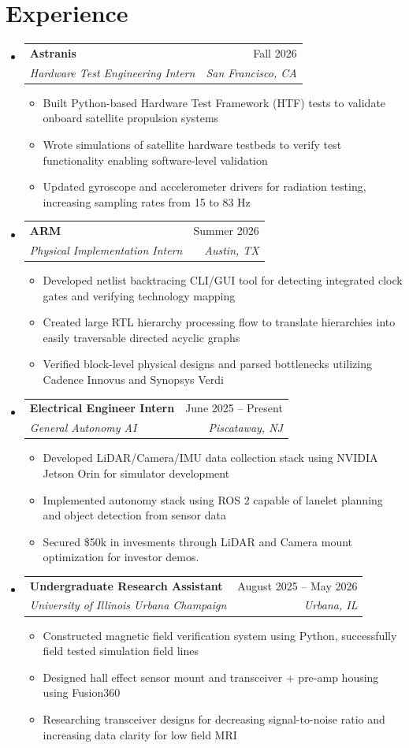 \documentclass[letterpaper,11pt]{article}
\makeatletter
\newcommand{\resumeItem}[1]{
  \item\small{
    {#1 \vspace{-2pt}}
  }
}
\newcommand{\resumeSubheading}[4]{
  \vspace{-2pt}\item
    \begin{tabular*}{0.97\textwidth}[t]{l@{\extracolsep{\fill}}r}
      \textbf{#1} & #2 \\
      \textit{\small#3} & \textit{\small #4} \\
    \end{tabular*}\vspace{-7pt}
}
\newcommand{\resumeSubHeadingListStart}{\begin{itemize}[leftmargin=0.15in, label={}]}
\newcommand{\resumeSubHeadingListEnd}{\end{itemize}}
\newcommand{\resumeItemListStart}{\begin{itemize}}
\newcommand{\resumeItemListEnd}{\end{itemize}\vspace{-5pt}}
\makeatother
\begin{document}
\section{Experience}
    \resumeSubHeadingListStart
     \resumeSubheading
        {Astranis}{Fall 2026} {Hardware Test Engineering Intern}{San Francisco, CA}
        \resumeItemListStart
        \resumeItem{Built Python-based Hardware Test Framework (HTF) tests to validate onboard satellite propulsion systems}
        \resumeItem{Wrote simulations of satellite hardware testbeds to verify test functionality enabling software-level validation}
        \resumeItem{Updated gyroscope and accelerometer drivers for radiation testing, increasing sampling rates from 15 to 83 Hz}
    \resumeItemListEnd
     \resumeSubheading
        {ARM}{Summer 2026} {Physical Implementation Intern}{Austin, TX}
        \resumeItemListStart
        \resumeItem{Developed netlist backtracing CLI/GUI tool for detecting integrated clock gates and verifying technology mapping}
        \resumeItem{Created large RTL hierarchy processing flow to translate hierarchies into easily traversable directed acyclic graphs}
        \resumeItem{Verified block-level physical designs and parsed bottlenecks utilizing Cadence Innovus and Synopsys Verdi}
    \resumeItemListEnd
     \resumeSubheading
      {Electrical Engineer Intern}{June 2025 -- Present}
      {General Autonomy AI}{Piscataway, NJ}
      \resumeItemListStart
        \resumeItem{Developed LiDAR/Camera/IMU data collection stack using NVIDIA Jetson Orin for simulator development}
        \resumeItem{Implemented autonomy stack using ROS 2 capable of lanelet planning and object detection from sensor data}
        \resumeItem{Secured \$50k in invesments through LiDAR and Camera mount optimization for investor demos.  }
    \resumeItemListEnd
    \resumeSubheading
      {Undergraduate Research Assistant}{August 2025 -- May 2026}
      {University of Illinois Urbana Champaign}{Urbana, IL}
      \resumeItemListStart
        \resumeItem{Constructed magnetic field verification system using Python, successfully field tested simulation field lines}
        \resumeItem{Designed hall effect sensor mount and transceiver + pre-amp housing using Fusion360}
        \resumeItem{Researching transceiver designs for decreasing signal-to-noise ratio and increasing data clarity for low field MRI}
      \resumeItemListEnd
      
  \resumeSubHeadingListEnd
\end{document}
